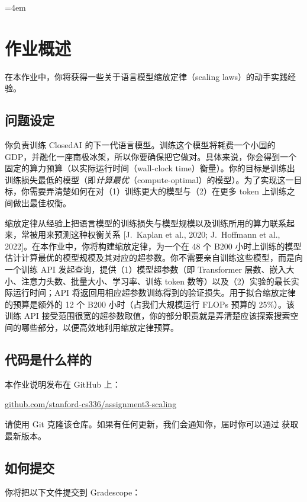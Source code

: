 \emergencystretch=4em
\section{作业概述}

在本作业中，你将获得一些关于语言模型缩放定律（scaling laws）的动手实践经验。

\subsection*{问题设定}

你负责训练 ClosedAI 的下一代语言模型。训练这个模型将耗费一个小国的 GDP，并融化一座南极冰架，所以你要确保把它做对。具体来说，你会得到一个固定的算力预算（以实际运行时间（wall-clock time）衡量）。你的目标是训练出训练损失最低的模型（即\textit{计算最优}（compute-optimal）的模型）。为了实现这一目标，你需要弄清楚如何在对（1）训练更大的模型与（2）在更多 token 上训练之间做出最佳权衡。

缩放定律从经验上把语言模型的训练损失与模型规模以及训练所用的算力联系起来，常被用来预测这种权衡关系 [J.~Kaplan et al., 2020; J.~Hoffmann et al., 2022]。在本作业中，你将构建缩放定律，为一个在 48 个 B200 小时上训练的模型估计计算最优的模型规模及其对应的超参数。你不需要亲自训练这些模型，而是向一个训练 API 发起查询，提供（1）模型超参数（即 Transformer 层数、嵌入大小、注意力头数、批量大小、学习率、训练 token 数等）以及（2）实验的最长实际运行时间；API 将返回用相应超参数训练得到的验证损失。用于拟合缩放定律的预算是额外的 12 个 B200 小时（占我们大规模运行 FLOPs 预算的 25\%）。该训练 API 接受范围很宽的超参数取值，你的部分职责就是弄清楚应该探索搜索空间的哪些部分，以便高效地利用缩放定律预算。

\subsection*{代码是什么样的}

本作业说明发布在 GitHub 上：

\begin{center}
\url{github.com/stanford-cs336/assignment3-scaling}
\end{center}

请使用 Git 克隆该仓库。如果有任何更新，我们会通知你，届时你可以通过  获取最新版本。

\subsection*{如何提交}

你将把以下文件提交到 Gradescope：

